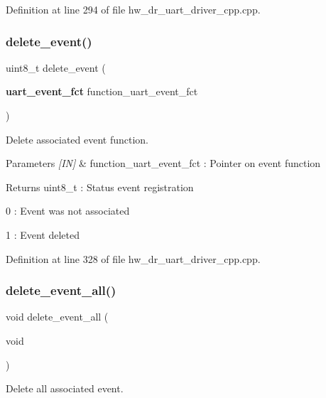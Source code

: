 Definition at line 294 of file hw\+\_\+dr\+\_\+uart\+\_\+driver\+\_\+cpp.\+cpp.

\mbox{\label{group___u_a_r_t_ga5d455e1ba65f4dee563b13f7f744855a}} 
\subsubsection{delete\_event()}
{\footnotesize\ttfamily uint8\+\_\+t delete\+\_\+event (\begin{DoxyParamCaption}\item[{\textbf{ uart\+\_\+event\+\_\+fct}}]{function\+\_\+uart\+\_\+event\+\_\+fct }\end{DoxyParamCaption})}



Delete associated event function. 


\begin{DoxyParams}{Parameters}
{\em \mbox{[}\+I\+N\mbox{]}} & function\+\_\+uart\+\_\+event\+\_\+fct \+: Pointer on event function \\
\hline
\end{DoxyParams}
\begin{DoxyReturn}{Returns}
uint8\+\_\+t \+: Status event registration \begin{DoxyItemize}
\item 0 \+: Event was not associated \item 1 \+: Event deleted \end{DoxyItemize}

\end{DoxyReturn}


Definition at line 328 of file hw\+\_\+dr\+\_\+uart\+\_\+driver\+\_\+cpp.\+cpp.

\mbox{\label{group___u_a_r_t_ga9459cdf9380eef6dc1b22277f769d7b8}} 
\subsubsection{delete\_event\_all()}
{\footnotesize\ttfamily void delete\+\_\+event\+\_\+all (\begin{DoxyParamCaption}\item[{void}]{ }\end{DoxyParamCaption})}



Delete all associated event. 


